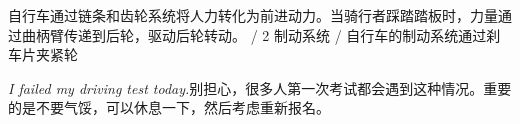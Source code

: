 \begin{multicols}{2}
自\allowbreak{}行\allowbreak{}车\allowbreak{}通\allowbreak{}过\allowbreak{}链\allowbreak{}条\allowbreak{}和\allowbreak{}齿\allowbreak{}轮\allowbreak{}\allowbreak{}系\allowbreak{}统\allowbreak{}将\allowbreak{}人\allowbreak{}力\allowbreak{}转\allowbreak{}化\allowbreak{}为\allowbreak{}前\allowbreak{}进\allowbreak{}\allowbreak{}动\allowbreak{}力\allowbreak{}。\allowbreak{}当\allowbreak{}骑\allowbreak{}行\allowbreak{}者\allowbreak{}踩\allowbreak{}踏\allowbreak{}踏\allowbreak{}\allowbreak{}板\allowbreak{}时\allowbreak{}，\allowbreak{}力\allowbreak{}量\allowbreak{}通\allowbreak{}过\allowbreak{}曲\allowbreak{}柄\allowbreak{}臂\allowbreak{}\allowbreak{}传\allowbreak{}递\allowbreak{}到\allowbreak{}后\allowbreak{}轮\allowbreak{}，\allowbreak{}驱\allowbreak{}动\allowbreak{}后\allowbreak{}轮\allowbreak{}\allowbreak{}转\allowbreak{}动\allowbreak{}。\allowbreak{} / 2 制\allowbreak{}动\allowbreak{}系\allowbreak{}统\allowbreak{} / 自\allowbreak{}行\allowbreak{}车\allowbreak{}的\allowbreak{}制\allowbreak{}动\allowbreak{}系\allowbreak{}统\allowbreak{}通\allowbreak{}过\allowbreak{}刹\allowbreak{}车\allowbreak{}片\allowbreak{}夹\allowbreak{}紧\allowbreak{}轮\allowbreak{}\par\noindent\textit{I failed my driving test today.}\enspace 别\allowbreak{}担\allowbreak{}心\allowbreak{}，\allowbreak{}很\allowbreak{}多\allowbreak{}人\allowbreak{}第\allowbreak{}一\allowbreak{}次\allowbreak{}\allowbreak{}考\allowbreak{}试\allowbreak{}都\allowbreak{}会\allowbreak{}遇\allowbreak{}到\allowbreak{}这\allowbreak{}种\allowbreak{}情\allowbreak{}况\allowbreak{}\allowbreak{}。\allowbreak{}重\allowbreak{}要\allowbreak{}的\allowbreak{}是\allowbreak{}不\allowbreak{}要\allowbreak{}气\allowbreak{}馁\allowbreak{}，\allowbreak{}\allowbreak{}可\allowbreak{}以\allowbreak{}休\allowbreak{}息\allowbreak{}一\allowbreak{}下\allowbreak{}，\allowbreak{}然\allowbreak{}后\allowbreak{}考\allowbreak{}\allowbreak{}虑\allowbreak{}重\allowbreak{}新\allowbreak{}报\allowbreak{}名\allowbreak{}。\allowbreak{}\par\medskip

\end{multicols}

